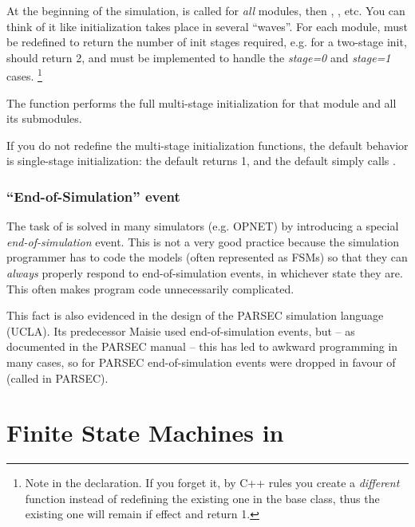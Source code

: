 At the beginning of the simulation, 
is called for \textit{all} modules, then ,
, etc. You can think of it like
initialization takes place in several ``waves''. For each module,
 must be redefined to return the number of init
stages required, e.g. for a two-stage init, 
should return 2, and  must be implemented to
handle the \textit{stage=0} and \textit{stage=1} cases.
  \footnote{Note  in the  declaration.
  If you forget it, by C++ rules you create a \textit{different} function
  instead of redefining the existing one in the base class, thus the
  existing one will remain if effect and return 1.}

The  function performs the full multi-stage initialization
for that module and all its submodules.

If you do not redefine the multi-stage initialization functions, the
default behavior is single-stage initialization: the default
 returns 1, and the default  simply calls .


\subsubsection{``End-of-Simulation'' event}


The task of  is solved in many simulators (e.g. OPNET)
by introducing a special
\textit{end-of-simulation} event. This is not
a very good practice because the simulation programmer has to code the
models (often represented as FSMs) so that they can \textit{always} properly
respond to end-of-simulation events, in whichever state they are. This
often makes program code unnecessarily complicated.

This fact is also evidenced in the design of the PARSEC
simulation language (UCLA). Its predecessor Maisie used
end-of-simulation events, but -- as documented in the PARSEC manual --
this has led to awkward programming in many cases, so for PARSEC
end-of-simulation events were dropped in favour of 
(called  in PARSEC).





\section{Finite State Machines in {\opp}}

